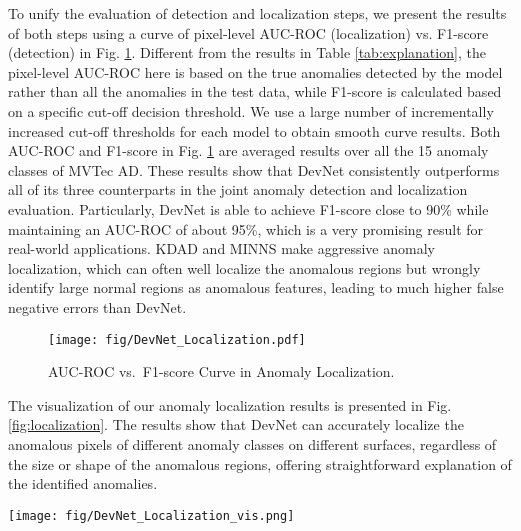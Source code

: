 \documentclass[10pt,journal,compsoc]{IEEEtran}
\begin{document}
To unify the evaluation of detection and localization steps, we present the results of both steps using a curve of pixel-level AUC-ROC (localization) vs. F1-score (detection) in Fig. \ref{fig:auc_fscore}. Different from the results in Table \ref{tab:explanation}, the pixel-level AUC-ROC here is based on the true anomalies detected by the model rather than all the anomalies in the test data, while F1-score is calculated based on a specific cut-off decision threshold. We use a large number of incrementally increased cut-off thresholds for each model to obtain smooth curve results. Both AUC-ROC and F1-score in Fig. \ref{fig:auc_fscore} are averaged results over all the 15 anomaly classes of MVTec AD. These results show that DevNet consistently outperforms all of its three counterparts in the joint anomaly detection and localization evaluation. Particularly, DevNet is able to achieve F1-score close to 90\% while maintaining an AUC-ROC of about 95\%, which is a very promising result for real-world applications. KDAD and MINNS make aggressive anomaly localization, which can often well localize the anomalous regions but wrongly identify large normal regions as anomalous features, leading to much higher false negative errors than DevNet.

\begin{figure}[h!]
  \centering
    \texttt{[image: fig/DevNet\_Localization.pdf]}
  \caption{AUC-ROC vs.\  F1-score Curve in Anomaly Localization.}
  \label{fig:auc_fscore}
\end{figure}

The visualization of our anomaly localization results is presented in Fig. \ref{fig:localization}. The results show that DevNet can accurately localize the anomalous pixels of different anomaly classes on different surfaces, regardless of the size or shape of the anomalous regions, offering straightforward explanation of the identified anomalies. 

\begin{figure*}[t!]
  \centering
    \texttt{[image: fig/DevNet\_Localization\_vis.png]}
  \caption{Visualization of Anomaly Localization for Two Groups of Images in MVTec AD. For each group of results, the first row is input image, followed by the pixel-level ground truth -- anomaly mask -- and our anomaly localization result. For each of the 15 anomaly classes, we present visualization of exemplar images from two different fine-grained types of anomaly within the class: Carpet (Thread and Color), Grid (Bent and Broken), Leather (Glue and Poke), Tile (Gray Stroke and Glue Strip), Wood (Color and Scratch), Bottle (Contamination and Broken Small), Capsule (Crack and Squeeze), Pill (Contamination and Color), Transistor (Cut Lead and Damaged Case), Zipper (Split Teeth and Fabric Border), Cable (Missing Wire and Bent Wire), Hazelnut (Hole and Cut), Metal\_nut (Color and Bent), Screw (Scratch Neck and Manipulated Front), and Toothbrush (no fine-grained anomaly types for this case).}
  \label{fig:localization}
\end{figure*}
\end{document}
